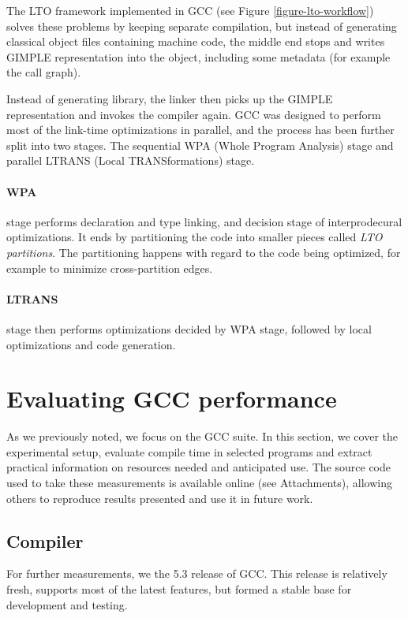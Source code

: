 The LTO framework implemented in GCC (see Figure \ref{figure-lto-workflow})
solves these problems by keeping separate compilation, but instead of generating
classical object files containing machine code, the middle end stops and writes
GIMPLE representation into the object, including some metadata (for example the
call graph).

Instead of generating library, the linker then picks up the GIMPLE
representation and invokes the compiler again. GCC was designed to perform most
of the link-time optimizations in parallel, and the process has been further split into
two stages. The sequential WPA (Whole Program Analysis) stage and parallel
LTRANS (Local TRANSformations) stage.

\paragraph{WPA} stage performs declaration and type linking, and decision stage
of interprodecural optimizations. It ends by partitioning the code into smaller
pieces called {\sl LTO partitions}. The partitioning happens with regard to the
code being optimized, for example to minimize cross-partition edges.

\paragraph{LTRANS} stage then performs optimizations decided by WPA stage,
followed by local optimizations and code generation.


\section{Evaluating GCC performance}

As we previously noted, we focus on the GCC suite. In this
section, we cover the experimental setup, evaluate compile time in selected
programs and extract practical information on resources needed and anticipated
use.  The source code used to take these measurements is available online (see
Attachments), allowing others to reproduce results presented and use it in future
work.  

\subsection{Compiler}

For further measurements, we the 5.3 release of GCC. This release is relatively
fresh, supports most of the latest features, but formed a stable base for
development and testing. 

